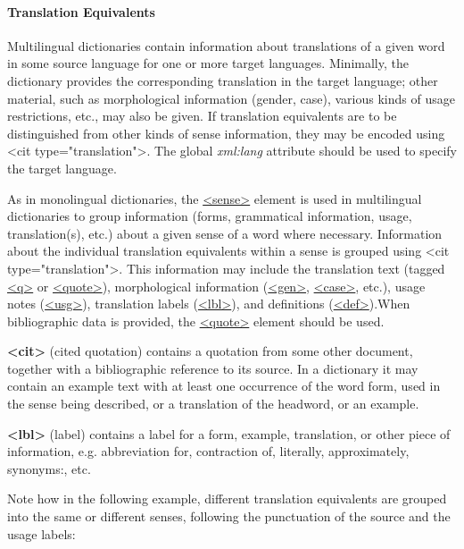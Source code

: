 \paragraph[{Translation Equivalents}]{Translation Equivalents}\label{DITPTR}\par
Multilingual dictionaries contain information about translations of a given word in some source language for one or more target languages. Minimally, the dictionary provides the corresponding translation in the target language; other material, such as morphological information (gender, case), various kinds of usage restrictions, etc., may also be given. If translation equivalents are to be distinguished from other kinds of sense information, they may be encoded using <cit type="translation">. The global {\itshape xml:lang} attribute should be used to specify the target language.\par
As in monolingual dictionaries, the \hyperref[TEI.sense]{<sense>} element is used in multilingual dictionaries to group information (forms, grammatical information, usage, translation(s), etc.) about a given sense of a word where necessary. Information about the individual translation equivalents within a sense is grouped using <cit type="translation">. This information may include the translation text (tagged \hyperref[TEI.q]{<q>} or \hyperref[TEI.quote]{<quote>}), morphological information (\hyperref[TEI.gen]{<gen>}, \hyperref[TEI.case]{<case>}, etc.), usage notes (\hyperref[TEI.usg]{<usg>}), translation labels (\hyperref[TEI.lbl]{<lbl>}), and definitions (\hyperref[TEI.def]{<def>}).When bibliographic data is provided, the \hyperref[TEI.quote]{<quote>} element should be used.
\begin{sansreflist}
  
\item [\textbf{<cit>}] (cited quotation) contains a quotation from some other document, together with a bibliographic reference to its source. In a dictionary it may contain an example text with at least one occurrence of the word form, used in the sense being described, or a translation of the headword, or an example.
\item [\textbf{<lbl>}] (label) contains a label for a form, example, translation, or other piece of information, e.g. abbreviation for, contraction of, literally, approximately, synonyms:, etc.
\end{sansreflist}
\par
Note how in the following example, different translation equivalents are grouped into the same or different senses, following the punctuation of the source and the usage labels:
